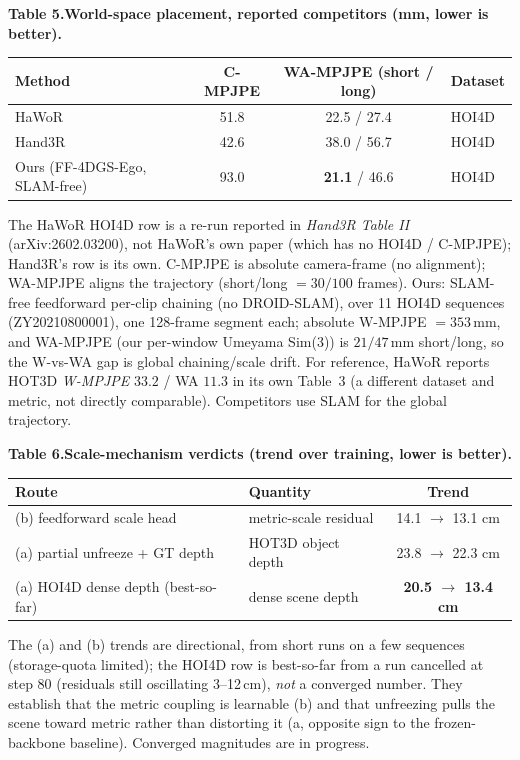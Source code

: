 \documentclass[10pt]{article}
\begin{document}
\vspace{0.3em}
\noindent\textbf{Table 5.\quad World-space placement, reported competitors (mm, lower is better).}
\begin{center}\begin{tabular}{lccl}
\toprule
Method & C-MPJPE & WA-MPJPE (short / long) & Dataset \\
\midrule
HaWoR & 51.8 & 22.5 / 27.4 & HOI4D \\
Hand3R & 42.6 & 38.0 / 56.7 & HOI4D \\
Ours (FF-4DGS-Ego, SLAM-free) & 93.0 & \textbf{21.1} / 46.6 & HOI4D \\
\bottomrule
\end{tabular}\end{center}
{\small\noindent The HaWoR HOI4D row is a re-run reported in \emph{Hand3R Table II}
(arXiv:2602.03200), not HaWoR's own paper (which has no HOI4D / C-MPJPE); Hand3R's row is its own.
C-MPJPE is absolute camera-frame (no alignment); WA-MPJPE aligns the trajectory (short/long
$=30/100$ frames). Ours: SLAM-free feedforward per-clip chaining (no DROID-SLAM), over 11 HOI4D
sequences (ZY20210800001), one 128-frame segment each; absolute W-MPJPE $=353$\,mm, and WA-MPJPE
(our per-window Umeyama Sim(3)) is $21/47$\,mm short/long, so the W-vs-WA gap is global chaining/scale
drift. For reference, HaWoR reports HOT3D \emph{W-MPJPE} $33.2$ / WA $11.3$ in its own Table~3 (a
different dataset and metric, not directly comparable). Competitors use SLAM for the global trajectory.}

\vspace{0.3em}
\noindent\textbf{Table 6.\quad Scale-mechanism verdicts (trend over training, lower is better).}
\begin{center}\begin{tabular}{llc}
\toprule
Route & Quantity & Trend \\
\midrule
(b) feedforward scale head & metric-scale residual & 14.1 $\rightarrow$ 13.1 cm \\
(a) partial unfreeze + GT depth & HOT3D object depth & 23.8 $\rightarrow$ 22.3 cm \\
(a) HOI4D dense depth (best-so-far) & dense scene depth & \textbf{20.5 $\rightarrow$ 13.4 cm} \\
\bottomrule
\end{tabular}\end{center}
{\small\noindent The (a) and (b) trends are directional, from short runs on a few sequences
(storage-quota limited); the HOI4D row is best-so-far from a run cancelled at step 80 (residuals still
oscillating 3--12\,cm), \emph{not} a converged number. They establish that the metric coupling is
learnable (b) and that unfreezing pulls the scene toward metric rather than distorting it (a, opposite
sign to the frozen-backbone baseline). Converged magnitudes are in progress.}
\end{document}
